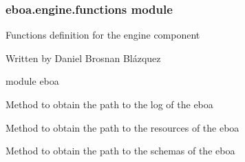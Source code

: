 \subsubsection{eboa.engine.functions module}
\label{\detokenize{eboa.engine:module-eboa.engine.functions}}\label{\detokenize{eboa.engine:eboa-engine-functions-module}}
Functions definition for the engine component

Written by Daniel Brosnan Blázquez

module eboa

\begin{fulllineitems}
\label{\detokenize{eboa.engine:eboa.engine.functions.get_log_path}}
Method to obtain the path to the log of the eboa

\end{fulllineitems}


\begin{fulllineitems}
\label{\detokenize{eboa.engine:eboa.engine.functions.get_resources_path}}
Method to obtain the path to the resources of the eboa

\end{fulllineitems}


\begin{fulllineitems}
\label{\detokenize{eboa.engine:eboa.engine.functions.get_schemas_path}}
Method to obtain the path to the schemas of the eboa

\end{fulllineitems}

